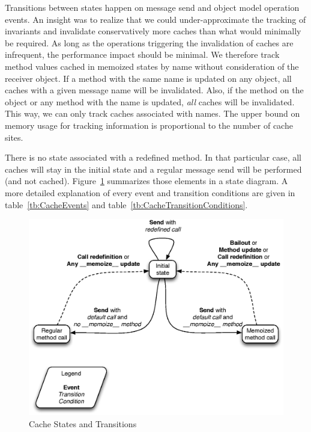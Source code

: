 Transitions between states happen on message send and object model operation
events.  An insight was to realize that we could under-approximate the tracking
of invariants and invalidate conservatively more caches than what would
minimally be required. As long as the operations triggering the invalidation of
caches are infrequent, the performance impact should be minimal. We therefore
track method values cached in memoized states by name without consideration of
the receiver object. If a method with the same name is updated on any object,
all caches with a given message name will be invalidated. Also, if the
 method on the  object or any method with the
 name is updated, \textit{all} caches will be invalidated. This
way, we can only track caches associated with names. The upper bound on memory
usage for tracking information is proportional to the number of cache sites.

There is no state associated with a redefined  method. In that
particular case, all caches will stay in the initial state and a regular
message send will be performed (and not cached). Figure~\ref{fig:CacheStates}
summarizes those elements in a state diagram. A more detailed explanation of
every event and transition conditions are given in table~\ref{tb:CacheEvents}
and table~\ref{tb:CacheTransitionConditions}.

\begin{figure}[htb]
\begin{center}
\includegraphics[width=\textwidth]{figures/cacheStates}
\caption{\label{fig:CacheStates} Cache States and Transitions}
\end{center}
\end{figure}

